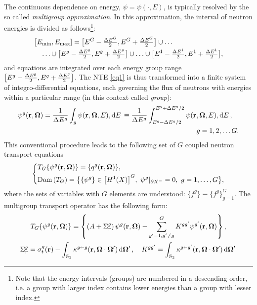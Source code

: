 The continuous dependence on energy, $\psi = \psi(\cdot, E)$, is typically resolved by the so called \textit{multigroup
approximation}. In this approximation, the interval of neutron energies is divided as follows\footnote{Note that the
energy intervals (groups) are numbered in a descending order, i.e. a group with larger index contains lower energies than a group with
lesser index.}:
$$
\begin{multlined}
  \bigl[\Emin,\Emax] = \bigl[E^{G}-\dEh{G},E^{G}+\dEh{G}\bigr]\cup \ldots\\
  \ldots \cup \bigl[E^{g}-\dEh{g}, E^{g}+\dEh{g}\bigr] \cup \ldots \cup
  \bigl[E^1-\dEh{1},E^{1}+\dEh{1}\bigr],
\end{multlined} 
$$
and equations  are integrated over each energy group range 
\linebreak
\mbox{$\bigl[E^{g}-\dEh{g}, E^{g}+\dEh{g}\bigr]$}.
The NTE \eqref{eq1} is thus transformed into a finite system of integro-differential
equations, each governing the flux of neutrons with energies within a particular range (in this context called
\textit{group}):
\begin{equation}\label{eq:psi-MG}
\begin{multlined}
  \psi^g(\br, \bomega) = \frac{1}{\Delta E^{g}}\int_{g}\psi(\br, \bomega, E),\d{E} \equiv
  \frac{1}{\Delta E^{g}}\int_{E^g-\Delta E^{g}/2}^{E^g+\Delta E^{g}/2}\psi(\br, \bomega, E),\d{E},\\ g = 1, 2,\ldots
  G.
\end{multlined}
\end{equation} 
This conventional procedure leads to the following set of $G$ coupled neutron transport equations
\begin{equation}\label{eq:mg}
	\left\{
	  \begin{aligned}
      &T_G\{\psi^g(\br,\bomega)\} = \{q^g(\br,\bomega)\},\\
      &\Dom{T_G} = \bigl\{\{\psi^g\}\in \bigl[\Hp[1](X)\bigr]^G,\ \psi^g\vert_{\pX[-]} = 0,\ g = 1,\ldots,G\bigr\},
    \end{aligned}
  \right.\\[.2em]
\end{equation}
where the sets of variables with $G$ elements are understood: $\{f^g\} \equiv \{f^g\}_{g=1}^G$. The multigroup transport
operator has the following form:
\begin{equation*}
\begin{gathered}
    T_G\{\psi^g(\br,\bomega)\} = \left\{\left(A + \Sigma_r^g\right)\psi^g(\br,\bomega) - \summ{g'=1,g'\neq g}{G}
    K^{gg'}\psi^{g'}(\br,\bomega)\right\},\\
    \Sigma_r^g = \sigma_t^g(\br) - \intA[']{\kappa^{g\sla g}(\br,\bomega\cdot\bomega')},\quad K^{gg'} = 
    \intA[']{\kappa^{g\sla g'}(\br,\bomega\cdot\bomega')}
\end{gathered}
\end{equation*}
